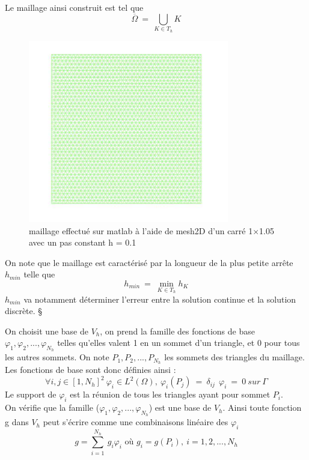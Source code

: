 \documentclass[a4paper,12pt,titlepage]{report}
\begin{document}
\begin{onehalfspace}
Le maillage ainsi construit est tel que
\[
\overline{\Omega} \ = \ \bigcup_{K \in T_{h}} K 
\]
\begin{figure}[h]
\begin{center}
\includegraphics[height = 8cm, keepaspectratio]{graphes/Maillage_initial.png} 
\caption{\label{figure 3 } maillage effectué sur matlab à l'aide de mesh2D d'un carré 1$\times$1.05 avec un pas constant h = 0.1}
\end{center}
\end{figure}

On note que le maillage est caractérisé par la longueur de la plus petite arrête $h_{min}$ telle que 
\[
h_{min} \ = \ \min_{K \in T_{h}} h_{K}
\]
$h_{min}$ va notamment déterminer l'erreur entre la solution continue et la solution discrète.
§

On choisit une base de $V_{h}$, on prend la famille des fonctions de base  \\ $\varphi_{1}, \varphi_{2}, ..., \varphi_{N_{h}}$  telles qu'elles valent 1 en un sommet d’un triangle, et 0 pour tous les autres sommets. On note $P_{1},P_{2}, ..., P_{N_{h}}$ les sommets des triangles du maillage.
Les fonctions de base sont donc définies ainsi :
\[
\forall i,j \in [1, N_{h}]^{2} \ \varphi_{i} \in L^{2}(\Omega),\ \varphi_{i}(P_{j}) \ = \ \delta_{ij} \ \
\varphi_{i} \ = \ 0 \ sur \ \Gamma \]
Le support de $ \varphi_{i}$ est la réunion de tous les triangles ayant pour sommet $P_{i}$.\\
On vérifie que la famille ($\varphi_{1}, \varphi_{2}, ..., \varphi_{N_{h}}$) est une base de $V_{h}$.
Ainsi toute fonction g dans $V_{h}$ peut s'écrire comme une combinaisons linéaire des $\varphi_{i}$
\[
g = \sum_{i=1}^{N_{h}}{\ g_{i}\varphi_{i}} \text{ \ \ où } g_{i} = g(P_{i}),\  i= 1,2,...,N_{h}
\]
 

\end{onehalfspace}
\end{document}
